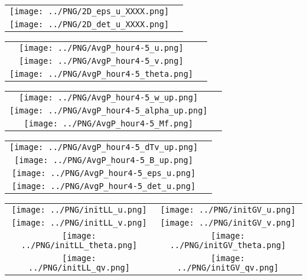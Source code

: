 \documentclass{article}
\begin{document}
\newpage

\begin{table}
  \begin{tabular}{cc}
     \texttt{[image: ../PNG/2D\_eps\_u\_XXXX.png]} & \\%
     \texttt{[image: ../PNG/2D\_det\_u\_XXXX.png]} & %
  \end{tabular}
\end{table}

\newpage

\begin{table}
  \begin{tabular}{cc}
     \texttt{[image: ../PNG/AvgP\_hour4-5\_u.png]}     \\
     \texttt{[image: ../PNG/AvgP\_hour4-5\_v.png]}     \\
     \texttt{[image: ../PNG/AvgP\_hour4-5\_theta.png]}
  \end{tabular}
\end{table}

\newpage

\begin{table}
  \begin{tabular}{cc}
     \texttt{[image: ../PNG/AvgP\_hour4-5\_w\_up.png]}     \\
     \texttt{[image: ../PNG/AvgP\_hour4-5\_alpha\_up.png]} \\
     \texttt{[image: ../PNG/AvgP\_hour4-5\_Mf.png]}       
  \end{tabular}
\end{table}

\newpage

\begin{table}
  \begin{tabular}{cc}
     \texttt{[image: ../PNG/AvgP\_hour4-5\_dTv\_up.png]} \\
     \texttt{[image: ../PNG/AvgP\_hour4-5\_B\_up.png]}   \\
     \texttt{[image: ../PNG/AvgP\_hour4-5\_eps\_u.png]}  \\
     \texttt{[image: ../PNG/AvgP\_hour4-5\_det\_u.png]}  
  \end{tabular}
\end{table}

\newpage

\begin{table}
  \begin{tabular}{cc}
     \texttt{[image: ../PNG/initLL\_u.png]}     & \texttt{[image: ../PNG/initGV\_u.png]}     \\
     \texttt{[image: ../PNG/initLL\_v.png]}     & \texttt{[image: ../PNG/initGV\_v.png]}     \\
     \texttt{[image: ../PNG/initLL\_theta.png]} & \texttt{[image: ../PNG/initGV\_theta.png]} \\
     \texttt{[image: ../PNG/initLL\_qv.png]}    & \texttt{[image: ../PNG/initGV\_qv.png]}
  \end{tabular}
\end{table}
\end{document}

